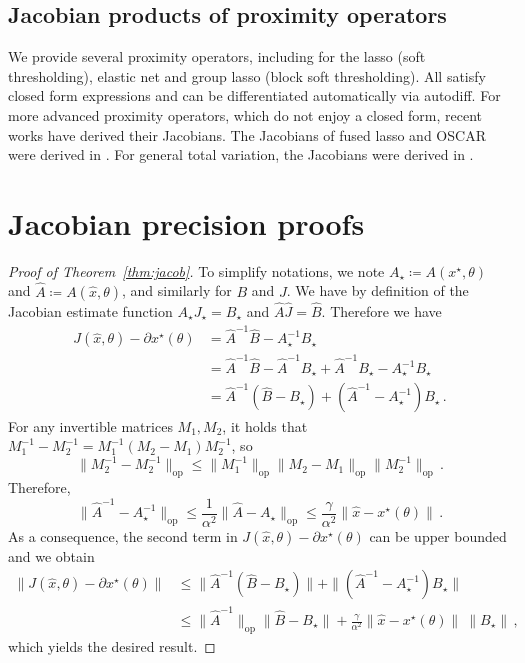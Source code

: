 \documentclass{article}
\begin{document}
\subsection{Jacobian products of proximity operators}

We provide several proximity operators, including for the lasso (soft
thresholding), elastic net and group lasso (block soft thresholding).
All satisfy closed form expressions and can be differentiated automatically via
autodiff.
For more advanced proximity operators, which do not enjoy a closed form,
recent works have derived their Jacobians. 
The Jacobians of fused lasso and OSCAR were derived in
\cite{niculae_2017}.  For general total variation, the Jacobians were derived in
\cite{vaiter_2013,cherkaoui_2020}.

\section{Jacobian precision proofs}
\label{appendix:proofs}

\begin{proof}[Proof of Theorem~\ref{thm:jacob}]
To simplify notations, we note $A_\star \coloneqq A(x^\star, \theta)$ and $\hat
A \coloneqq
A(\hat x, \theta)$, and similarly for $B$ and $J$. We have by definition of the
Jacobian estimate function $A_\star J_\star = B_\star$ and $\hat A \hat J = \hat
B$. Therefore we have
    \begin{align}
        J(\hat x, \theta) - \partial x^\star (\theta) &= \hat A^{-1} \hat B - A_\star^{-1} B_\star \\
        &= \hat A^{-1} \hat B - \hat A^{-1} B_\star + \hat A^{-1} B_\star - A_\star^{-1} B_\star \\
        &= \hat A^{-1}( \hat B -  B_\star) + (\hat A^{-1} - A_\star^{-1}) B_\star\, .
    \end{align}
For any invertible matrices $M_1, M_2$, it holds that $M_1^{-1} - M_2^{-1} = M_1^{-1} (M_2 - M_1) M_2^{-1}$, so 
\begin{equation}\label{eq:normproduct}
    \|M_2^{-1} - M_2^{-1}\|_{\text{op}} \leq \|M_1^{-1}\|_{\text{op}} \|M_2 -
    M_1\|_{\text{op}} \|M_2^{-1}\|_{\text{op}} \,.
\end{equation}
Therefore,
\begin{equation}\label{eq:lipinv}
    \|\hat A^{-1} - A_\star^{-1}\|_{\text{op}} \le \frac{1}{\alpha^2} \|\hat A -
    A_\star\|_{\text{op}}   \le \frac{\gamma}{\alpha^2}  \|\hat x - x^\star(\theta)\|\, .
\end{equation}
As a consequence, the second term in $J(\hat x, \theta) - \partial x^\star (\theta)$ can be upper bounded and we obtain
    \begin{align}
        \|J(\hat x, \theta) - \partial x^\star (\theta)\| &\le \|\hat A^{-1}( \hat B -  B_\star)\| + \|(\hat A^{-1} - A_\star^{-1}) B_\star\| \\
        &\le \|\hat A^{-1} \|_{\text{op}}\| \hat B -  B_\star\| +\frac{\gamma}{\alpha^2} \|\hat x - x^\star(\theta)\|\ \|B_\star\|  \, ,
    \end{align}
which yields the desired result.
\end{proof}
\end{document}
